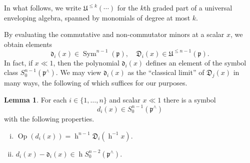\documentclass[reqno]{amsart}
\DeclareMathOperator{\h}{h}
\DeclareMathOperator{\Sym}{Sym}
\DeclareMathOperator{\Opp}{Op}
\theoremstyle{plain} \newtheorem{theorem} {Theorem}
\theoremstyle{definition} \newtheorem{definition} [theorem] {Definition}
\theoremstyle{itplain} %
\newtheorem{lemma}[theorem]{Lemma}
\numberwithin{equation}{section}
\numberwithin{theorem}{section}
\renewcommand{\leq}{\leqslant}
\begin{document}
In what follows, we write $\mathfrak{U}^{\leq k}(\dotsb)$ for the $k$th graded part of a universal enveloping algebra, spanned by monomials of degree at most $k$.

By evaluating the commutative and non-commutator minors at a scalar $x$, we obtain elements
\begin{equation*}
\mathfrak{d}_i(x) \in \Sym^{n-1}(\mathfrak{p}), \quad \mathfrak{D}_i(x) \in \mathfrak{U}^{\leq n-1}(\mathfrak{p}).
\end{equation*}
In fact, if $x \ll 1$, then the polynomial $\mathfrak{d}_i(x)$ defines an element of the symbol class $S^{n-1}_0(\mathfrak{p}^\wedge)$.  We may view $\mathfrak{d}_i(x)$ as the ``classical limit'' of $\mathfrak{D}_j(x)$ in many ways, the following of which suffices for our purposes.
\begin{lemma}\label{lem:non-comm-cofact}
  For each $i \in \{1, \dotsc, n\}$ and scalar $x \ll 1$ there is a symbol
  \[
    d_i(x) \in S_0^{n-1}(\mathfrak{p}^\wedge)
  \]
  with the following properties.
  \begin{enumerate}[(i)]
  \item $\Opp(d_i(x)) = \h^{n-1} \mathfrak{D}_i(\h^{-1} x)$.
  \item $d_i(x) - \mathfrak{d}_i(x) \in \h S_0^{n-2}(\mathfrak{p}^\wedge)$.
  \end{enumerate}
\end{lemma}
\end{document}
